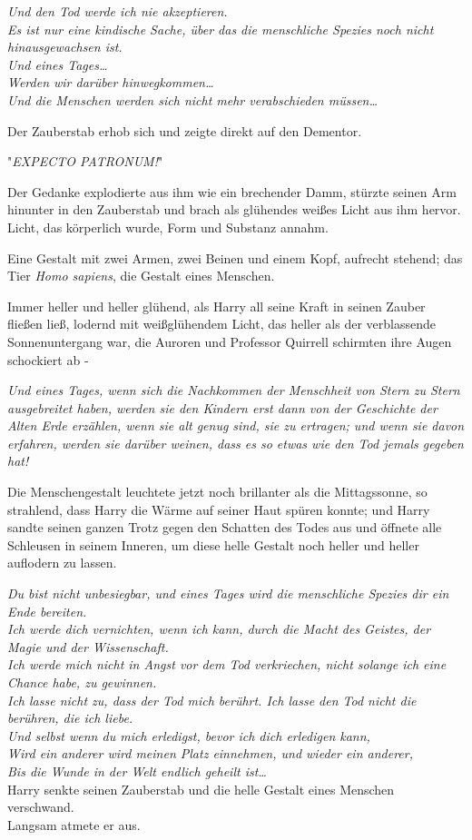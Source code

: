 {\emph{Und den Tod werde ich nie akzeptieren.}\\ \emph{Es ist nur eine kindische Sache, über das die menschliche Spezies noch nicht hinausgewachsen ist.}\\ \emph{Und eines Tages…}\\ \emph{Werden wir darüber hinwegkommen…}\\ \emph{Und die Menschen werden sich nicht mehr verabschieden müssen…}

Der Zauberstab erhob sich und zeigte direkt auf den Dementor.

"\emph{EXPECTO PATRONUM!}"

Der Gedanke explodierte aus ihm wie ein brechender Damm, stürzte seinen Arm hinunter in den Zauberstab und brach als glühendes weißes Licht aus ihm hervor. Licht, das körperlich wurde, Form und Substanz annahm.

Eine Gestalt mit zwei Armen, zwei Beinen und einem Kopf, aufrecht stehend; das Tier \emph{Homo sapiens}, die Gestalt eines Menschen.

Immer heller und heller glühend, als Harry all seine Kraft in seinen Zauber fließen ließ, lodernd mit weißglühendem Licht, das heller als der verblassende Sonnenuntergang war, die Auroren und Professor Quirrell schirmten ihre Augen schockiert ab -

\emph{Und eines Tages, wenn sich die Nachkommen der Menschheit von Stern zu Stern ausgebreitet haben, werden sie den Kindern erst dann von der Geschichte der Alten Erde erzählen, wenn sie alt genug sind, sie zu ertragen; und wenn sie davon erfahren, werden sie darüber weinen, dass es so etwas wie den Tod jemals gegeben hat!}

Die Menschengestalt leuchtete jetzt noch brillanter als die Mittagssonne, so strahlend, dass Harry die Wärme auf seiner Haut spüren konnte; und Harry sandte seinen ganzen Trotz gegen den Schatten des Todes aus und öffnete alle Schleusen in seinem Inneren, um diese helle Gestalt noch heller und heller auflodern zu lassen.

\emph{Du bist nicht unbesiegbar, und eines Tages wird die menschliche Spezies dir ein Ende bereiten.}\\ \emph{Ich werde dich vernichten, wenn ich kann, durch die Macht des Geistes, der Magie und der Wissenschaft.}\\ \emph{Ich werde mich nicht in Angst vor dem Tod verkriechen, nicht solange ich eine Chance habe, zu gewinnen.}\\ \emph{Ich lasse nicht zu, dass der Tod mich berührt. Ich lasse den Tod nicht die berühren, die ich liebe.}\\ \emph{Und selbst wenn du mich erledigst, bevor ich dich erledigen kann,}\\ \emph{Wird ein anderer wird meinen Platz einnehmen, und wieder ein anderer,}\\ \emph{Bis die Wunde in der Welt endlich geheilt ist…}\\ Harry senkte seinen Zauberstab und die helle Gestalt eines Menschen verschwand.\\ Langsam atmete er aus.

}
